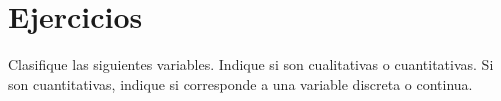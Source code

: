 \documentclass{templateNote}
\begin{document}
\portada
\margenes %




\section{Ejercicios}
Clasifique las siguientes variables. Indique si son cualitativas o cuantitativas. Si son cuantitativas, indique si corresponde a una variable discreta o continua.
\end{document}
